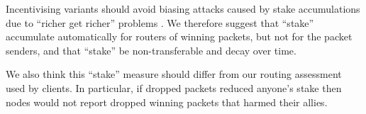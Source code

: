 ﻿\documentclass{sig-alternate-hotpets}
\begin{document}
\smallskip

Incentivising variants should avoid biasing attacks caused by
stake accumulations due to ``richer get richer'' problems \cite{CompoundingPoS}.
We therefore suggest that ``stake'' accumulate automatically for
routers of winning packets, but not for the packet senders, and that
``stake'' be non-transferable and decay over time. 

We also think this ``stake'' measure should differ from our routing
assessment used by clients.  In particular, if dropped packets reduced
anyone's stake then nodes would not report dropped winning packets
that harmed their allies. 





\end{document}
